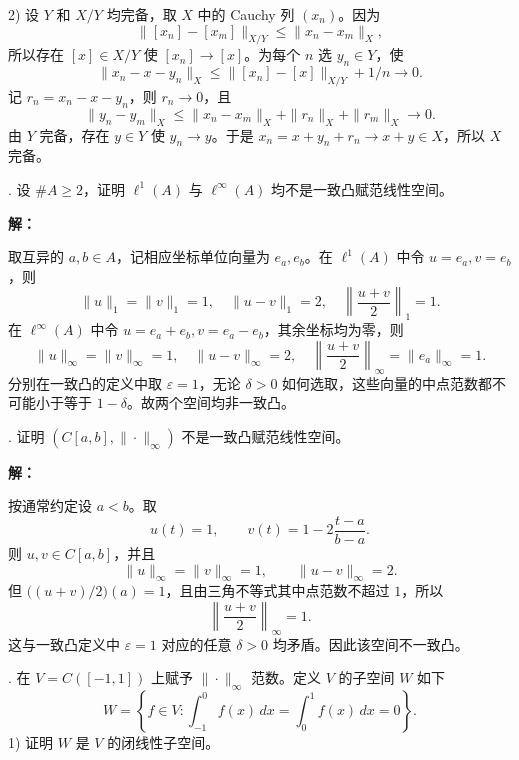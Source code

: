 \documentclass{article}
\begin{document}
2) 设 $Y$ 和 $X/Y$ 均完备，取 $X$ 中的 Cauchy 列 $(x_n)$。因为
\[
\|[x_n]-[x_m]\|_{X/Y}\le\|x_n-x_m\|_X,
\]
所以存在 $[x]\in X/Y$ 使 $[x_n]\to[x]$。为每个 $n$ 选 $y_n\in Y$，使
\[
\|x_n-x-y_n\|_X\le\|[x_n]-[x]\|_{X/Y}+1/n\longrightarrow0.
\]
记 $r_n=x_n-x-y_n$，则 $r_n\to0$，且
\[
\|y_n-y_m\|_X\le\|x_n-x_m\|_X+\|r_n\|_X+\|r_m\|_X\longrightarrow0.
\]
由 $Y$ 完备，存在 $y\in Y$ 使 $y_n\to y$。于是 $x_n=x+y_n+r_n\to x+y\in X$，所以 $X$ 完备。


\par\medskip{}. 设 $\#A\ge2$，证明 $\ell^1(A)$ 与 $\ell^\infty(A)$ 均不是一致凸赋范线性空间。


\par{}\noindent\textbf{解：}\par\nopagebreak[4]



取互异的 $a,b\in A$，记相应坐标单位向量为 $e_a,e_b$。在 $\ell^1(A)$ 中令 $u=e_a,v=e_b$，则
\[
\|u\|_1=\|v\|_1=1,\quad\|u-v\|_1=2,\quad
\left\|\frac{u+v}{2}\right\|_1=1.
\]
在 $\ell^\infty(A)$ 中令 $u=e_a+e_b,v=e_a-e_b$，其余坐标均为零，则
\[
\|u\|_\infty=\|v\|_\infty=1,\quad\|u-v\|_\infty=2,\quad
\left\|\frac{u+v}{2}\right\|_\infty=\|e_a\|_\infty=1.
\]
分别在一致凸的定义中取 $\varepsilon=1$，无论 $\delta>0$ 如何选取，这些向量的中点范数都不可能小于等于 $1-\delta$。故两个空间均非一致凸。


\par\medskip{}. 证明 $(C[a,b],\|\cdot\|_\infty)$ 不是一致凸赋范线性空间。


\par{}\noindent\textbf{解：}\par\nopagebreak[4]



按通常约定设 $a<b$。取
\[
u(t)=1,\qquad v(t)=1-2\frac{t-a}{b-a}.
\]
则 $u,v\in C[a,b]$，并且
\[
\|u\|_\infty=\|v\|_\infty=1,\qquad\|u-v\|_\infty=2.
\]
但 $\bigl((u+v)/2\bigr)(a)=1$，且由三角不等式其中点范数不超过 $1$，所以
\[
\left\|\frac{u+v}{2}\right\|_\infty=1.
\]
这与一致凸定义中 $\varepsilon=1$ 对应的任意 $\delta>0$ 均矛盾。因此该空间不一致凸。


\par\medskip{}. 在 $V=C([-1,1])$ 上赋予 $\|\cdot\|_\infty$ 范数。定义 $V$ 的子空间 $W$ 如下
\[
W=\left\{f\in V:\int_{-1}^0 f(x)\,dx=\int_0^1 f(x)\,dx=0\right\}.
\]
1) 证明 $W$ 是 $V$ 的闭线性子空间。
\end{document}
